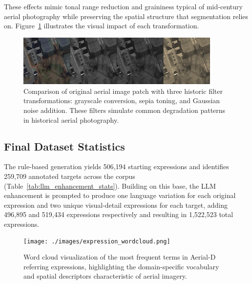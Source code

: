 These effects mimic tonal range reduction and graininess typical of mid‑century aerial photography while preserving the spatial structure that segmentation relies on. Figure~\ref{fig:historic_filters} illustrates the visual impact of each transformation.

\begin{figure}[t]
\centering
\includegraphics[width=0.9\textwidth]{./images/filters.png}
\caption{Comparison of original aerial image patch with three historic filter transformations: grayscale conversion, sepia toning, and Gaussian noise addition. These filters simulate common degradation patterns in historical aerial photography.}
\label{fig:historic_filters}
\end{figure}

\subsection{Final Dataset Statistics}

The rule-based generation yields 506{,}194 starting expressions and identifies 259{,}709 annotated targets across the corpus (Table~\ref{tab:llm_enhancement_stats}). Building on this base, the LLM enhancement is prompted to produce one language variation for each original expression and two unique visual‑detail expressions for each target, adding 496{,}895 and 519{,}434 expressions respectively and resulting in 1{,}522{,}523 total expressions.


\begin{figure}[!t]
\centering
\texttt{[image: ./images/expression\_wordcloud.png]}
\caption{Word cloud visualization of the most frequent terms in Aerial-D referring expressions, highlighting the domain-specific vocabulary and spatial descriptors characteristic of aerial imagery.}
\label{fig:expression_wordcloud}
\end{figure}

